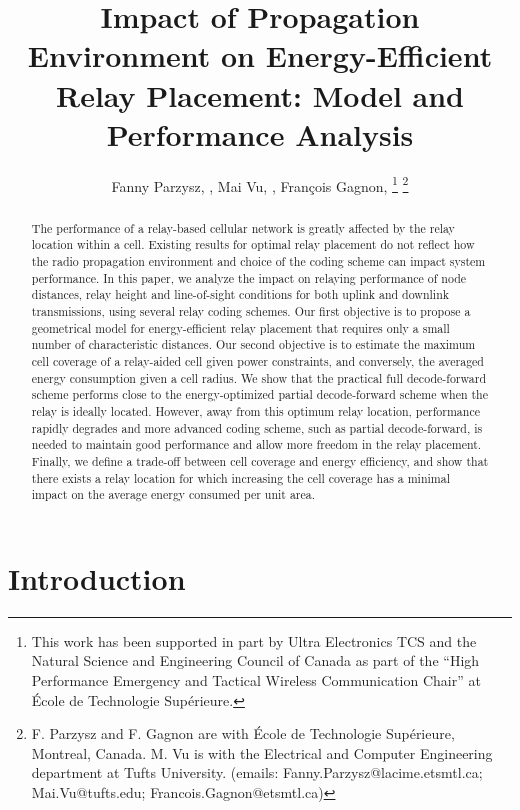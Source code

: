 \documentclass[journal]{IEEEtran}
\title{\fontsize{23}{28}\selectfont Impact of Propagation Environment on Energy-Efficient Relay Placement: Model and Performance Analysis}
\author{Fanny Parzysz, \IEEEmembership{Student Member IEEE}, Mai Vu, \IEEEmembership{Senior Member IEEE}, Fran\c cois Gagnon, \IEEEmembership{Senior Member IEEE}\thanks{This work has been supported in part by Ultra Electronics TCS and the Natural Science and Engineering Council of Canada as part of the “High Performance Emergency and Tactical Wireless Communication Chair” at \'{E}cole de Technologie Sup\'{e}rieure.}
\thanks{F. Parzysz and F. Gagnon are with \'Ecole de Technologie Sup\'erieure, Montreal, Canada. M. Vu is with the  Electrical and Computer Engineering department at Tufts University. (emails: Fanny.Parzysz@lacime.etsmtl.ca; Mai.Vu@tufts.edu; Francois.Gagnon@etsmtl.ca) }
}
\theoremstyle{definition}
\begin{document}
\maketitle

\setcounter{algorithmcounter}{\value{table}}
\addtocounter{algorithmcounter}{1}

\setcounter{tableau}{1}


\begin{abstract}
The performance of a relay-based cellular network is greatly affected by the relay location within a cell.
Existing results for optimal relay placement do not reflect how the radio propagation environment and choice of the coding scheme can impact system performance.
In this paper, we analyze the impact on relaying performance of node distances, relay height and line-of-sight conditions for both uplink and downlink transmissions, using several relay coding schemes. 
Our first objective is to propose a geometrical model for energy-efficient relay placement that requires
only a small number of characteristic distances.
Our second objective is to estimate the maximum cell coverage of a relay-aided cell given power constraints, and conversely, the averaged energy consumption given a cell radius.
We show that the practical full decode-forward scheme performs close to the energy-optimized partial decode-forward scheme when the relay is ideally located. However, away from this optimum relay location, performance rapidly degrades and more advanced coding scheme, such as partial decode-forward, is needed to maintain good performance and allow more freedom in the relay placement.
Finally, we define a trade-off between cell coverage and energy efficiency, and show that there exists a relay location for which increasing the cell coverage has a minimal impact on the average energy consumed per unit area. 

 
\end{abstract}



\section{Introduction}
\label{introduction}
\end{document}
